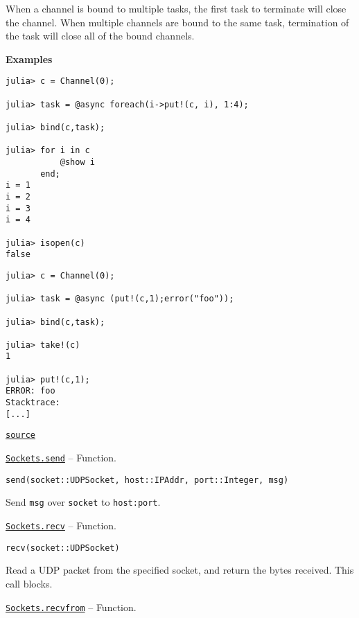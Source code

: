\begin{adjustwidth}{2em}{0pt}
When a channel is bound to multiple tasks, the first task to terminate will close the channel. When multiple channels are bound to the same task, termination of the task will close all of the bound channels.

\textbf{Examples}


\begin{verbatim}
julia> c = Channel(0);

julia> task = @async foreach(i->put!(c, i), 1:4);

julia> bind(c,task);

julia> for i in c
           @show i
       end;
i = 1
i = 2
i = 3
i = 4

julia> isopen(c)
false
\end{verbatim}


\begin{verbatim}
julia> c = Channel(0);

julia> task = @async (put!(c,1);error("foo"));

julia> bind(c,task);

julia> take!(c)
1

julia> put!(c,1);
ERROR: foo
Stacktrace:
[...]
\end{verbatim}



\href{https://github.com/JuliaLang/julia/blob/44fa15b1502a45eac76c9017af94332d4557b251/base/channels.jl#L194-L243}{\texttt{source}}


\end{adjustwidth}
\hypertarget{14996317088638800111}{} 
\hyperlink{14996317088638800111}{\texttt{Sockets.send}}  -- {Function.}

\begin{adjustwidth}{2em}{0pt}


\begin{verbatim}
send(socket::UDPSocket, host::IPAddr, port::Integer, msg)
\end{verbatim}

Send \texttt{msg} over \texttt{socket} to \texttt{host:port}.



\end{adjustwidth}
\hypertarget{8720184196970920051}{} 
\hyperlink{8720184196970920051}{\texttt{Sockets.recv}}  -- {Function.}

\begin{adjustwidth}{2em}{0pt}


\begin{verbatim}
recv(socket::UDPSocket)
\end{verbatim}

Read a UDP packet from the specified socket, and return the bytes received. This call blocks.



\end{adjustwidth}
\hypertarget{10286416413585635173}{} 
\hyperlink{10286416413585635173}{\texttt{Sockets.recvfrom}}  -- {Function.}


